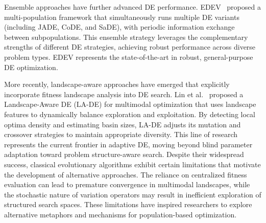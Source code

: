 \documentclass[11pt]{article}
\begin{document}
Ensemble approaches have further advanced DE performance. EDEV~\citep{wu2018edev} proposed a multi-population framework that simultaneously runs multiple DE variants (including JADE, CoDE, and SaDE), with periodic information exchange between subpopulations. This ensemble strategy leverages the complementary strengths of different DE strategies, achieving robust performance across diverse problem types. EDEV represents the state-of-the-art in robust, general-purpose DE optimization.

More recently, landscape-aware approaches have emerged that explicitly incorporate fitness landscape analysis into DE search. Lin et al.~\citep{lin2025landscape} proposed a Landscape-Aware DE (LA-DE) for multimodal optimization that uses landscape features to dynamically balance exploration and exploitation. By detecting local optima density and estimating basin sizes, LA-DE adjusts its mutation and crossover strategies to maintain appropriate diversity. This line of research represents the current frontier in adaptive DE, moving beyond blind parameter adaptation toward problem structure-aware search.
Despite their widespread success, classical evolutionary algorithms exhibit certain limitations that motivate the development of alternative approaches. The reliance on centralized fitness evaluation can lead to premature convergence in multimodal landscapes, while the stochastic nature of variation operators may result in inefficient exploration of structured search spaces. These limitations have inspired researchers to explore alternative metaphors and mechanisms for population-based optimization.
\end{document}
